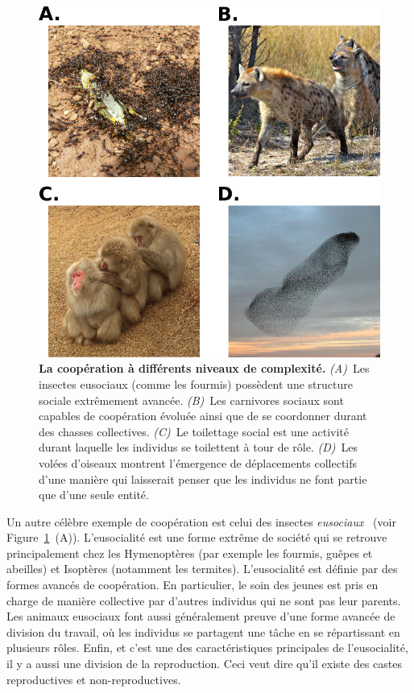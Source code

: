 	  \begin{figure}[hbt]
	      \begin{center}
	        \includegraphics[scale = 0.5]{fig/Intro/CooperationExamples.png}
	        \caption{\textbf{La coopération à différents niveaux de complexité.} {\em (A)}~Les insectes eusociaux (comme les fourmis) possèdent une structure sociale extrêmement avancée. {\em (B)}~Les carnivores sociaux sont capables de coopération évoluée ainsi que de se coordonner durant des chasses collectives. {\em (C)}~Le toilettage social est une activité durant laquelle les individus se toilettent à tour de rôle. {\em (D)}~Les volées d'oiseaux montrent l'émergence de déplacements collectifs d'une manière qui laisserait penser que les individus ne font partie que d'une seule entité.} 
	        \label{fig:CooperationExamples}
	      \end{center}
	  \end{figure}

		Un autre célèbre exemple de coopération est celui des insectes \emph{eusociaux}~\parencite{Wilson1990} (voir Figure~\ref{fig:CooperationExamples}~(A)). L'eusocialité est une forme extrême de société qui se retrouve principalement chez les Hymenoptères (par exemple les fourmis, guêpes et abeilles) et Isoptères (notamment les termites). L'eusocialité est définie par des formes avancés de coopération. En particulier, le soin des jeunes est pris en charge de manière collective par d'autres individus qui ne sont pas leur parents. Les animaux eusociaux font aussi généralement preuve d'une forme avancée de division du travail, où les individus se partagent une tâche en se répartissant en plusieurs rôles. Enfin, et c'est une des caractéristiques principales de l'eusocialité, il y a aussi une division de la reproduction. Ceci veut dire qu'il existe des castes reproductives et non-reproductives.

